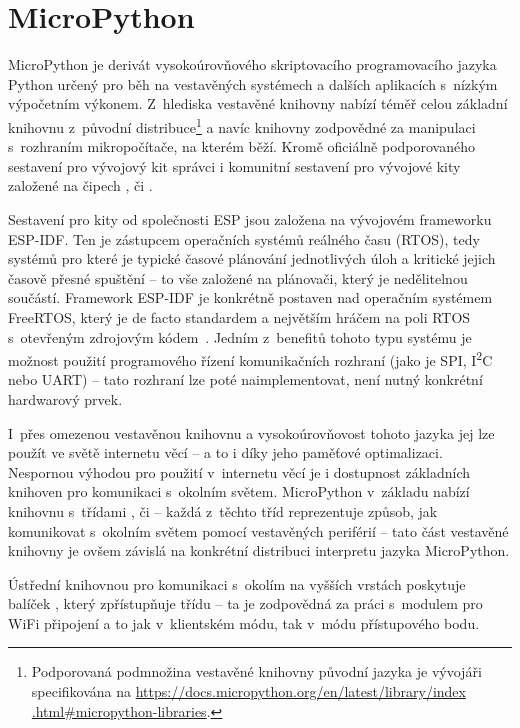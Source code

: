 \section{MicroPython}\label{sec:micropython}
MicroPython je derivát vysokoúrovňového skriptovacího programovacího jazyka Python určený pro běh na vestavěných
systémech a dalších aplikacích s~nízkým výpočetním výkonem.
Z~hlediska vestavěné knihovny nabízí téměř celou základní knihovnu z~původní distribuce\footnote{Podporovaná podmnožina
vestavěné knihovny původní jazyka je vývojáři specifikována na \url{https://docs.micropython.org/en/latest/library/index
.html\#micropython-libraries}.} a navíc knihovny
zodpovědné za manipulaci s~rozhraním mikropočítače, na kterém běží.
Kromě oficiálně podporovaného sestavení pro vývojový kit  správci i komunitní sestavení pro
vývojové kity založené na čipech ,  či .

Sestavení pro kity od společnosti ESP jsou založena na vývojovém frameworku ESP-IDF.
Ten je zástupcem operačních systémů reálného času (RTOS), tedy systémů pro které je typické časové plánování
jednotlivých úloh a kritické jejich časově přesné spuštění -- to vše založené na plánovači, který je
nedělitelnou součástí.
Framework ESP-IDF je konkrétně postaven nad operačním systémem FreeRTOS, který je de facto standardem a největším hráčem
na poli RTOS s~otevřeným zdrojovým kódem~\cite{RTOSSelection}.
Jedním z~benefitů tohoto typu systému je možnost použití programového řízení komunikačních rozhraní
(jako je SPI, I\textsuperscript{2}C nebo UART) -- tato rozhraní lze poté naimplementovat, není nutný konkrétní
hardwarový prvek.

I~přes omezenou vestavěnou knihovnu a vysokoúrovňovost tohoto jazyka jej lze použít ve světě internetu věcí --
a to i díky jeho paměťové optimalizaci.
Nespornou výhodou pro použití v~internetu věcí je i dostupnost základních knihoven pro komunikaci s~okolním světem.
MicroPython v~základu nabízí knihovnu  s~třídami ,  či  --
každá z~těchto tříd reprezentuje způsob, jak komunikovat s~okolním světem pomocí vestavěných periférií
-- tato část vestavěné knihovny je ovšem závislá na konkrétní distribuci interpretu jazyka MicroPython.

Ústřední knihovnou pro komunikaci s~okolím na vyšších vrstách poskytuje balíček , který zpřístupňuje
třídu  -- ta je zodpovědná za práci s~modulem pro WiFi připojení a to jak v~klientském módu, tak v~módu
přístupového bodu.

